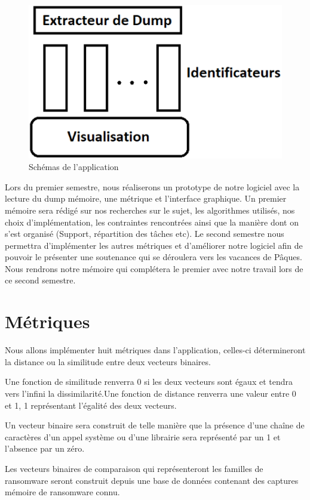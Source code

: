 \documentclass[11pt]{article}
\begin{document}
\begin{figure}[h]
  \centering
  \includegraphics[scale=0.40]{unknown.eps}
  \caption{Schémas de l'application}
\end{figure}

Lors du premier semestre, nous réaliserons un prototype de notre logiciel avec la lecture du dump mémoire, une métrique et l’interface graphique. Un premier mémoire sera rédigé sur nos recherches sur le sujet, les algorithmes utilisés, nos choix d’implémentation, les contraintes rencontrées ainsi que la manière dont on s’est organisé (Support, répartition des tâches etc).
Le second semestre nous permettra d’implémenter les autres métriques et d’améliorer notre logiciel afin de pouvoir le présenter une soutenance qui se déroulera vers les vacances de Pâques. Nous rendrons notre mémoire qui complétera le premier avec notre travail lors de ce second semestre. 

\section{Métriques}
Nous allons implémenter huit métriques dans l'application, celles-ci détermineront la distance ou la similitude entre deux vecteurs binaires.

Une fonction de similitude renverra 0 si les deux vecteurs sont égaux et tendra vers l'infini la dissimilarité.Une fonction de distance renverra une valeur entre 0 et 1, 1 représentant l'égalité des deux vecteurs.

Un vecteur binaire sera construit de telle manière que la présence d'une chaîne de caractères d'un appel système ou d'une librairie sera représenté par un 1 et l'absence par un zéro.

Les vecteurs binaires de comparaison qui représenteront les familles de ransomware seront construit depuis une base de données contenant des captures mémoire de ransomware connu.
\end{document}
